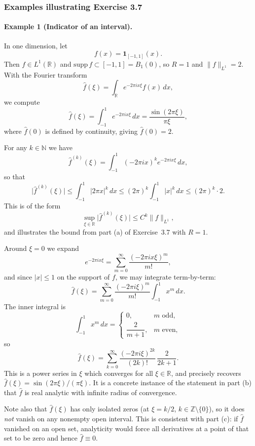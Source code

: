 \documentclass[12pt,a4paper]{article}
\theoremstyle{plain}
\theoremstyle{definition}
\theoremstyle{remark}
\theoremstyle{remark}
\begin{document}
\subsubsection*{Examples illustrating Exercise 3.7}

\paragraph{Example 1 (Indicator of an interval).}
In one dimension, let
\[
f(x) = \mathbf{1}_{[-1,1]}(x).
\]
Then $f\in L^{1}(\mathbb{R})$ and $\mathrm{supp}\,f\subset[-1,1]=B_{1}(0)$, so $R=1$
and $\|f\|_{L^{1}}=2$. With the Fourier transform
\[
\widehat{f}(\xi)
= \int_{\mathbb{R}} e^{-2\pi i x\xi} f(x)\,dx,
\]
we compute
\[
\widehat{f}(\xi)
= \int_{-1}^{1} e^{-2\pi i x\xi}\,dx
= \frac{\sin(2\pi\xi)}{\pi\xi},
\]
where $\widehat{f}(0)$ is defined by continuity, giving $\widehat{f}(0)=2$.

For any $k\in\mathbb{N}$ we have
\[
\widehat{f}^{(k)}(\xi)
= \int_{-1}^{1} (-2\pi i x)^{k} e^{-2\pi i x\xi}\,dx,
\]
so that
\[
\big|\widehat{f}^{(k)}(\xi)\big|
\le \int_{-1}^{1} |2\pi x|^{k}\,dx
\le (2\pi)^{k} \int_{-1}^{1} |x|^{k}\,dx
\le (2\pi)^{k} \cdot 2.
\]
This is of the form
\[
\sup_{\xi\in\mathbb{R}} \big|\widehat{f}^{(k)}(\xi)\big|
\le C^{k} \|f\|_{L^{1}},
\]
and illustrates the bound from part (a) of Exercise~3.7 with $R=1$.

Around $\xi=0$ we expand
\[
e^{-2\pi i x\xi} = \sum_{m=0}^{\infty}
\frac{(-2\pi i x\xi)^{m}}{m!},
\]
and since $|x|\le 1$ on the support of $f$, we may integrate term-by-term:
\[
\widehat{f}(\xi)
= \sum_{m=0}^{\infty} \frac{(-2\pi i \xi)^{m}}{m!}
\int_{-1}^{1} x^{m}\,dx.
\]
The inner integral is
\[
\int_{-1}^{1} x^{m}\,dx
=
\begin{cases}
	0, & m \text{ odd},\\[0.3em]
	\dfrac{2}{m+1}, & m \text{ even},
\end{cases}
\]
so
\[
\widehat{f}(\xi)
= \sum_{k=0}^{\infty}
\frac{(-2\pi i \xi)^{2k}}{(2k)!}\,\frac{2}{2k+1}.
\]
This is a power series in $\xi$ which converges for all $\xi\in\mathbb{R}$, and
precisely recovers $\widehat{f}(\xi)=\sin(2\pi\xi)/(\pi\xi)$. It is a concrete
instance of the statement in part (b) that $\widehat{f}$ is real analytic with
infinite radius of convergence.

Note also that $\widehat{f}(\xi)$ has only isolated zeros (at $\xi=k/2$,
$k\in\mathbb{Z}\setminus\{0\}$), so it does \emph{not} vanish on any nonempty
open interval. This is consistent with part (c): if $\widehat{f}$ vanished on an
open set, analyticity would force all derivatives at a point of that set to be
zero and hence $\widehat{f}\equiv 0$.
\end{document}
